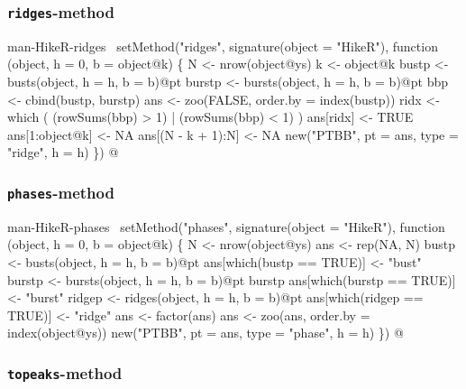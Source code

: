 \documentclass[a4paper]{article}
\begin{document}
\subsubsection{\texttt{ridges}-method}

\nwenddocs{}\endmoddef
\LA{}man-HikeR-ridges~{\nwtagstyle{}}\RA{}
setMethod("ridges",
    signature(object = "HikeR"),
    function (object, h = 0, b = object@k) \{
        N <- nrow(object@ys)
        k <- object@k
        bustp <- busts(object, h = h, b = b)@pt
        burstp <- bursts(object, h = h, b = b)@pt
        bbp <- cbind(bustp, burstp)
        ans <- zoo(FALSE, order.by = index(bustp))
        ridx <- which ( (rowSums(bbp) > 1) | (rowSums(bbp) < 1) )
        ans[ridx] <- TRUE
        ans[1:object@k] <- NA
        ans[(N - k + 1):N] <- NA
        new("PTBB", pt = ans, type = "ridge", h = h)
\})
\nwendcode{}@

\subsubsection{\texttt{phases}-method}

\nwenddocs{}\endmoddef
\LA{}man-HikeR-phases~{\nwtagstyle{}}\RA{}
setMethod("phases",
    signature(object = "HikeR"),
    function (object, h = 0, b = object@k) \{
        N <- nrow(object@ys)
        ans <- rep(NA, N)
        bustp <- busts(object, h = h, b = b)@pt
        ans[which(bustp == TRUE)] <- "bust"
        burstp <- bursts(object, h = h, b = b)@pt
        burstp
        ans[which(burstp == TRUE)] <- "burst"
        ridgep <- ridges(object, h = h, b = b)@pt
        ans[which(ridgep == TRUE)] <- "ridge"
        ans <- factor(ans)
        ans <- zoo(ans, order.by = index(object@ys))
        new("PTBB", pt = ans, type = "phase", h = h)
\})
\nwendcode{}@

\subsubsection{\texttt{topeaks}-method}
\end{document}
